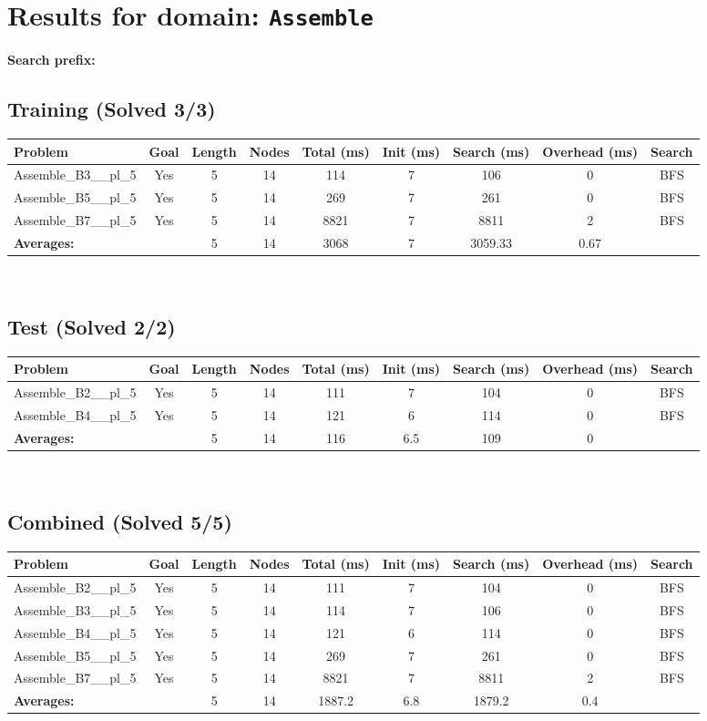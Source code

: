 \documentclass{article}
\begin{document}
\section*{Results for domain: \texttt{Assemble}}
\textbf{Search prefix:} 
\\[0.5cm]
\subsection*{Training (Solved 3/3)}
\begin{tabular}{lcccccccc}
\toprule
Problem & Goal & Length & Nodes & Total (ms) & Init (ms) & Search (ms) & Overhead (ms) & Search \\
\midrule
Assemble\_B3\_\_pl\_5 & Yes & 5 & 14 & 114 & 7 & 106 & 0 & BFS \\
Assemble\_B5\_\_pl\_5 & Yes & 5 & 14 & 269 & 7 & 261 & 0 & BFS \\
Assemble\_B7\_\_pl\_5 & Yes & 5 & 14 & 8821 & 7 & 8811 & 2 & BFS \\
\textbf{Averages:} & & 5 & 14 & 3068 & 7 & 3059.33 & 0.67 & \\
\bottomrule
\end{tabular}
\\[0.7cm]
\subsection*{Test (Solved 2/2)}
\begin{tabular}{lcccccccc}
\toprule
Problem & Goal & Length & Nodes & Total (ms) & Init (ms) & Search (ms) & Overhead (ms) & Search \\
\midrule
Assemble\_B2\_\_pl\_5 & Yes & 5 & 14 & 111 & 7 & 104 & 0 & BFS \\
Assemble\_B4\_\_pl\_5 & Yes & 5 & 14 & 121 & 6 & 114 & 0 & BFS \\
\textbf{Averages:} & & 5 & 14 & 116 & 6.5 & 109 & 0 & \\
\bottomrule
\end{tabular}
\\[0.7cm]
\subsection*{Combined (Solved 5/5)}
\begin{tabular}{lcccccccc}
\toprule
Problem & Goal & Length & Nodes & Total (ms) & Init (ms) & Search (ms) & Overhead (ms) & Search \\
\midrule
Assemble\_B2\_\_pl\_5 & Yes & 5 & 14 & 111 & 7 & 104 & 0 & BFS \\
Assemble\_B3\_\_pl\_5 & Yes & 5 & 14 & 114 & 7 & 106 & 0 & BFS \\
Assemble\_B4\_\_pl\_5 & Yes & 5 & 14 & 121 & 6 & 114 & 0 & BFS \\
Assemble\_B5\_\_pl\_5 & Yes & 5 & 14 & 269 & 7 & 261 & 0 & BFS \\
Assemble\_B7\_\_pl\_5 & Yes & 5 & 14 & 8821 & 7 & 8811 & 2 & BFS \\
\textbf{Averages:} & & 5 & 14 & 1887.2 & 6.8 & 1879.2 & 0.4 & \\
\bottomrule
\end{tabular}
\\[0.7cm]
\end{document}
